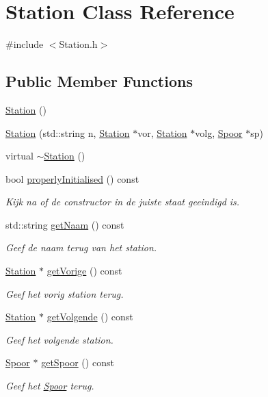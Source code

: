 \hypertarget{class_station}{}\section{Station Class Reference}
\label{class_station}


{\ttfamily \#include $<$Station.\+h$>$}

\subsection*{Public Member Functions}
\begin{DoxyCompactItemize}
\item 
\hyperlink{class_station_a73d335726aad1d844d81cda6d9fd74e6}{Station} ()
\item 
\hyperlink{class_station_a1685ff9a628b922fbc6a75f0f23c7b7e}{Station} (std\+::string n, \hyperlink{class_station}{Station} $\ast$vor, \hyperlink{class_station}{Station} $\ast$volg, \hyperlink{class_spoor}{Spoor} $\ast$sp)
\item 
virtual \hyperlink{class_station_a00434e79e8ee7f4ebd6d3b631dde5ac0}{$\sim$\+Station} ()
\item 
bool \hyperlink{class_station_a5749af84d13b71d34aa1fb5b0a935a20}{properly\+Initialised} () const 
\begin{DoxyCompactList}\small\item\em Kijk na of de constructor in de juiste staat geeindigd is. \end{DoxyCompactList}\item 
std\+::string \hyperlink{class_station_a6d4234bcd1027dc83c7984e207e8bd74}{get\+Naam} () const 
\begin{DoxyCompactList}\small\item\em Geef de naam terug van het station. \end{DoxyCompactList}\item 
\hyperlink{class_station}{Station} $\ast$ \hyperlink{class_station_a2adced993339721e8731bfa55762f4f9}{get\+Vorige} () const 
\begin{DoxyCompactList}\small\item\em Geef het vorig station terug. \end{DoxyCompactList}\item 
\hyperlink{class_station}{Station} $\ast$ \hyperlink{class_station_a2c81d14029f13b972c015a16813c8d34}{get\+Volgende} () const 
\begin{DoxyCompactList}\small\item\em Geef het volgende station. \end{DoxyCompactList}\item 
\hyperlink{class_spoor}{Spoor} $\ast$ \hyperlink{class_station_af7ea9d2ec05b56832c0e1a2fe2303ee1}{get\+Spoor} () const 
\begin{DoxyCompactList}\small\item\em Geef het \hyperlink{class_spoor}{Spoor} terug. \end{DoxyCompactList}\end{DoxyCompactItemize}


